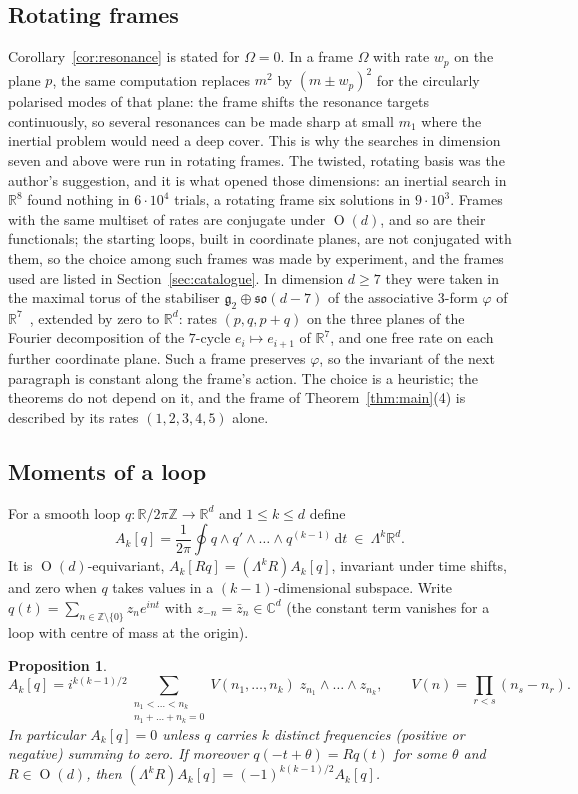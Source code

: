 \documentclass[11pt]{amsart}
\newtheorem{proposition}[theorem]{Proposition}
\theoremstyle{definition}
\newcommand{\R}{\mathbb{R}}
\newcommand{\Z}{\mathbb{Z}}
\newcommand{\C}{\mathbb{C}}
\newcommand{\so}{\mathfrak{so}}
\newcommand{\dd}{\,\mathrm{d}}
\DeclareMathOperator{\Orth}{O}
\begin{document}
\subsection{Rotating frames}\label{sec:frames}
Corollary~\ref{cor:resonance} is stated for $\Omega=0$. In a frame $\Omega$ with rate $w_p$ on the plane $p$, the same computation replaces $m^2$ by $(m\pm w_p)^2$ for the circularly polarised modes of that plane: the frame shifts the resonance targets continuously, so several resonances can be made sharp at small $m_1$ where the inertial problem would need a deep cover. This is why the searches in dimension seven and above were run in rotating frames. The twisted, rotating basis was the author's suggestion, and it is what opened those dimensions: an inertial search in $\R^8$ found nothing in $6\cdot10^4$ trials, a rotating frame six solutions in $9\cdot10^3$. Frames with the same multiset of rates are conjugate under $\Orth(d)$, and so are their functionals; the starting loops, built in coordinate planes, are not conjugated with them, so the choice among such frames was made by experiment, and the frames used are listed in Section~\ref{sec:catalogue}. In dimension $d\ge7$ they were taken in the maximal torus of the stabiliser $\mathfrak g_2\oplus\so(d-7)$ of the associative $3$-form $\varphi$ of $\R^7$~\cite{HarveyLawson1982}, extended by zero to $\R^d$: rates $(p,q,p+q)$ on the three planes of the Fourier decomposition of the $7$-cycle $e_i\mapsto e_{i+1}$ of $\R^7$, and one free rate on each further coordinate plane. Such a frame preserves $\varphi$, so the invariant of the next paragraph is constant along the frame's action. The choice is a heuristic; the theorems do not depend on it, and the frame of Theorem~\ref{thm:main}(4) is described by its rates $(1,2,3,4,5)$ alone.

\subsection{Moments of a loop}
For a smooth loop $q\colon\R/2\pi\Z\to\R^d$ and $1\le k\le d$ define
\[
A_k[q]=\frac1{2\pi}\oint q\wedge q'\wedge\dots\wedge q^{(k-1)}\dd t\ \in\ \Lambda^k\R^d .
\]
It is $\Orth(d)$-equivariant, $A_k[Rq]=(\Lambda^kR)A_k[q]$, invariant under time shifts, and zero when $q$ takes values in a $(k-1)$-dimensional subspace. Write $q(t)=\sum_{n\in\Z\setminus\{0\}}z_ne^{int}$ with $z_{-n}=\bar z_n\in\C^d$ (the constant term vanishes for a loop with centre of mass at the origin).

\begin{proposition}\label{prop:jet}
\[
A_k[q]=i^{k(k-1)/2}\sum_{\substack{n_1<\dots<n_k\\ n_1+\dots+n_k=0}}V(n_1,\dots,n_k)\;z_{n_1}\wedge\dots\wedge z_{n_k},\qquad V(n)=\prod_{r<s}(n_s-n_r).
\]
In particular $A_k[q]=0$ unless $q$ carries $k$ distinct frequencies (positive or negative) summing to zero. If moreover $q(-t+\theta)=Rq(t)$ for some $\theta$ and $R\in\Orth(d)$, then $(\Lambda^kR)A_k[q]=(-1)^{k(k-1)/2}A_k[q]$.
\end{proposition}
\end{document}
